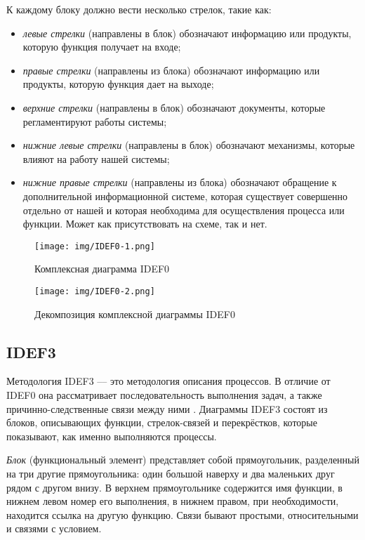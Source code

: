 \documentclass[14pt,russian]{extarticle}
\newcommand*\obj[1]{\textit{#1}}
\begin{document}
К каждому блоку должно вести несколько стрелок, такие как:

\begin{itemize}
	\item \obj{левые стрелки} (направлены в блок) обозначают информацию или
		продукты, которую функция получает на входе;

	\item \obj{правые стрелки} (направлены из блока) обозначают информацию
		или продукты, которую функция дает на выходе;

	\item \obj{верхние стрелки} (направлены в блок) обозначают документы,
		которые регламентируют работы системы;

	\item \obj{нижние левые стрелки} (направлены в блок) обозначают
		механизмы, которые влияют на работу нашей системы;

	\item \obj{нижние правые стрелки} (направлены из блока) обозначают
		обращение к дополнительной информационной системе, которая
		существует совершенно отдельно от нашей и которая необходима для
		осуществления процесса или функции. Может как присутствовать на
		схеме, так и нет.
\end{itemize}

\begin{figure}[H]
	\centering
	\texttt{[image: img/IDEF0-1.png]}
	\caption{Комплексная диаграмма IDEF0}
\end{figure}

\begin{figure}[H]
	\centering
	\texttt{[image: img/IDEF0-2.png]}
	\caption{Декомпозиция комплексной диаграммы IDEF0}
\end{figure}

\subsection{IDEF3}

Методология IDEF3 –-- это методология описания процессов. В отличие от IDEF0 она
рассматривает последовательность выполнения задач, а также причинно-следственные
связи между ними \cite{idef3}. Диаграммы IDEF3 состоят из блоков, описывающих функции,
стрелок-связей и перекрёстков, которые показывают, как именно выполняются
процессы.

\obj{Блок} (функциональный элемент) представляет собой прямоугольник, разделенный на
три другие прямоугольника: один большой наверху и два маленьких друг рядом с
другом внизу. В верхнем прямоугольнике содержится имя функции, в нижнем левом
номер его выполнения, в нижнем правом, при необходимости, находится ссылка на
другую функцию. Связи бывают простыми, относительными и связями с условием.
\end{document}
